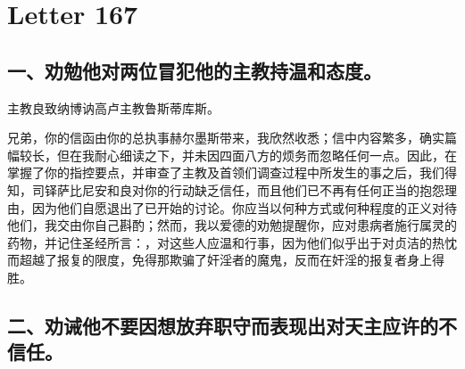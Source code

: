 

\section{Letter 167}

\par


\subsection{一、劝勉他对两位冒犯他的主教持温和态度。}

主教良致纳博讷高卢主教鲁斯蒂库斯。\par

兄弟，你的信函由你的总执事赫尔墨斯带来，我欣然收悉；信中内容繁多，确实篇幅较长，但在我耐心细读之下，并未因四面八方的烦务而忽略任何一点。因此，在掌握了你的指控要点，并审查了主教及首领们调查过程中所发生的事之后，我们得知，司铎萨比尼安和良对你的行动缺乏信任，而且他们已不再有任何正当的抱怨理由，因为他们自愿退出了已开始的讨论。你应当以何种方式或何种程度的正义对待他们，我交由你自己斟酌；然而，我以爱德的劝勉提醒你，应对患病者施行属灵的药物，并记住圣经所言：，对这些人应温和行事，因为他们似乎出于对贞洁的热忱而超越了报复的限度，免得那欺骗了奸淫者的魔鬼，反而在奸淫的报复者身上得胜。\par


\subsection{二、劝诫他不要因想放弃职守而表现出对天主应许的不信任。}

